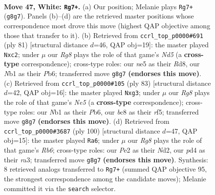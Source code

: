 \documentclass[11pt]{article}
\begin{document}
\clearpage

\begin{figure}[p]\centering
\begin{subfigure}{0.46\textwidth}\centering
\resizebox{\linewidth}{!}{%
\newchessgame
\chessboard[
  setfen={2b2rR1/p3k2p/1P6/4nP2/1p1p4/8/p3P3/1N1K4 w - - 0 47},
  showmover=false,
  pgfstyle=straightmove, color=movearrow, markmove={g8-g7}
]}
\caption{}
\end{subfigure}\hfill
\begin{subfigure}{0.46\textwidth}\centering
\resizebox{\linewidth}{!}{%
\newchessgame
\chessboard[
  setfen={3r4/6k1/1p1p4/1P1P1pp1/p1Rn4/7P/P1B2KP1/8 b - - 3 41},
  showmover=false,
  pgfstyle=straightmove, color=movearrow, markmove={d4-c2}
]}
\caption{}
\end{subfigure}
\\[4pt]
\begin{subfigure}{0.46\textwidth}\centering
\resizebox{\linewidth}{!}{%
\newchessgame
\chessboard[
  setfen={8/4k3/pp6/5R1p/1P2n2P/5BP1/1PPr4/6K1 b - - 0 42},
  showmover=false,
  pgfstyle=straightmove, color=movearrow, markmove={e4-g3}
]}
\caption{}
\end{subfigure}\hfill
\begin{subfigure}{0.46\textwidth}\centering
\resizebox{\linewidth}{!}{%
\newchessgame
\chessboard[
  setfen={8/2k2pp1/1Rb4p/P1p1P3/2P3P1/r6P/3NK3/8 w - - 14 51},
  showmover=false,
  pgfstyle=straightmove, color=movearrow, markmove={b6-a6}
]}
\caption{}
\end{subfigure}
\caption{\textbf{Move 47, White: \texttt{Rg7+}.} (a) Our position; Melanie plays \texttt{Rg7+} (\texttt{g8g7}). Panels (b)--(d) are the retrieved master positions whose correspondence most drove this move (highest QAP objective among those that transfer to it). (b) Retrieved from \texttt{ccrl\_top\_p0000\#691} (ply 81) [structural distance $d$=46, QAP obj=19]: the master played \texttt{Nxc2}; under $\mu$ our \emph{Rg8} plays the role of that game's \emph{Nd5} (a \textbf{cross-type} correspondence); cross-type roles: our \emph{n}e5 as their \emph{R}d8, our \emph{N}b1 as their \emph{P}b6; transferred move \texttt{g8g7} \textbf{(endorses this move)}. (c) Retrieved from \texttt{ccrl\_top\_p0000\#105} (ply 83) [structural distance $d$=42, QAP obj=16]: the master played \texttt{Nxg3}; under $\mu$ our \emph{Rg8} plays the role of that game's \emph{Ne5} (a \textbf{cross-type} correspondence); cross-type roles: our \emph{N}b1 as their \emph{P}b6, our \emph{b}c8 as their \emph{r}f5; transferred move \texttt{g8g7} \textbf{(endorses this move)}. (d) Retrieved from \texttt{ccrl\_top\_p0000\#3687} (ply 100) [structural distance $d$=47, QAP obj=15]: the master played \texttt{Ra6}; under $\mu$ our \emph{Rg8} plays the role of that game's \emph{Rb6}; cross-type roles: our \emph{P}e2 as their \emph{N}d2, our \emph{p}d4 as their \emph{r}a3; transferred move \texttt{g8g7} \textbf{(endorses this move)}. Synthesis: 8 retrieved analogs transferred to \texttt{Rg7+} (summed QAP objective 95, the strongest correspondence among the candidate moves); Melanie committed it via the \texttt{search} selector.}
\label{fig:thought-m92}
\end{figure}
\end{document}

